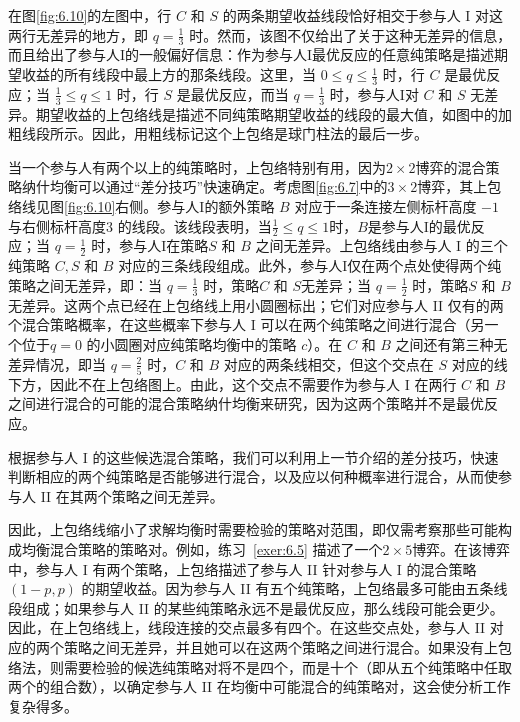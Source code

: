 在图\ref{fig:6.10}的左图中，行 \(C\) 和 \(S\) 的两条期望收益线段恰好相交于参与人 \(\mathrm{I}\) 对这两行无差异的地方，即 \(q = \frac{1}{3}\) 时。然而，该图不仅给出了关于这种无差异的信息，而且给出了参与人I的一般偏好信息：作为参与人I最优反应的任意纯策略是描述期望收益的所有线段中最上方的那条线段。这里，当 \(0 \leq  q \leq  \frac{1}{3}\) 时，行 \(C\) 是最优反应；当 \(\frac{1}{3} \leq  q \leq  1\) 时，行 \(S\) 是最优反应，而当 \(q = \frac{1}{3}\) 时，参与人I对 \(C\) 和 \(S\) 无差异。期望收益的上包络线是描述不同纯策略期望收益的线段的最大值，如图中的加粗线段所示。因此，用粗线标记这个上包络是球门柱法的最后一步。

当一个参与人有两个以上的纯策略时，上包络特别有用，因为$2\times 2$博弈的混合策略纳什均衡可以通过“差分技巧”快速确定。考虑图\ref{fig:6.7}中的$3\times 2$博弈，其上包络线见图\ref{fig:6.10}右侧。参与人I的额外策略 \(B\) 对应于一条连接左侧标杆高度 $−1$ 与右侧标杆高度$3$ 的线段。该线段表明，当\(\frac{1}{2} \leq  q \leq  1\)时，\(B\)是参与人I的最优反应；当 \(q = \frac{1}{2}\) 时，参与人I在策略\(S\) 和 \(B\) 之间无差异。上包络线由参与人 I 的三个纯策略 \(C,S\) 和 \(B\) 对应的三条线段组成。此外，参与人I仅在两个点处使得两个纯策略之间无差异，即：当 \(q = \frac{1}{3}\) 时，策略\(C\) 和 \(S\)无差异；当 \(q = \frac{1}{2}\) 时，策略\(S\) 和 \(B\) 无差异。这两个点已经在上包络线上用小圆圈标出；它们对应参与人 II 仅有的两个混合策略概率，在这些概率下参与人 I 可以在两个纯策略之间进行混合（另一个位于\(q = 0\) 的小圆圈对应纯策略均衡中的策略 \(c\)）。在 \(C\) 和 \(B\) 之间还有第三种无差异情况，即当 \(q = \frac{2}{5}\) 时，\(C\) 和 \(B\) 对应的两条线相交，但这个交点在 \(S\) 对应的线下方，因此不在上包络图上。由此，这个交点不需要作为参与人 I 在两行 \(C\) 和 \(B\) 之间进行混合的可能的混合策略纳什均衡来研究，因为这两个策略并不是最优反应。

根据参与人 I 的这些候选混合策略，我们可以利用上一节介绍的差分技巧，快速判断相应的两个纯策略是否能够进行混合，以及应以何种概率进行混合，从而使参与人 II 在其两个策略之间无差异。

因此，上包络线缩小了求解均衡时需要检验的策略对范围，即仅需考察那些可能构成均衡混合策略的策略对。例如，练习~\ref{exer:6.5} 描述了一个$2\times 5$博弈。在该博弈中，参与人 I 有两个策略，上包络描述了参与人 II 针对参与人 I 的混合策略 $(1 - p, p)$ 的期望收益。因为参与人 II 有五个纯策略，上包络最多可能由五条线段组成；如果参与人 II 的某些纯策略永远不是最优反应，那么线段可能会更少。因此，在上包络线上，线段连接的交点最多有四个。在这些交点处，参与人 II 对应的两个策略之间无差异，并且她可以在这两个策略之间进行混合。如果没有上包络法，则需要检验的候选纯策略对将不是四个，而是十个（即从五个纯策略中任取两个的组合数），以确定参与人 II 在均衡中可能混合的纯策略对，这会使分析工作复杂得多。

